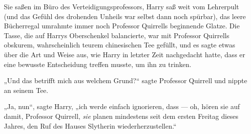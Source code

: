 Sie saßen im Büro des Verteidigungsprofessors, Harry saß weit vom Lehrerpult (und das Gefühl des drohenden Unheils war selbst dann noch spürbar), das leere Bücherregal umrahmte immer noch Professor Quirrells beginnende Glatze. Die Tasse, die auf Harrys Oberschenkel balancierte, war mit Professor Quirrells obskurem, wahrscheinlich teurem chinesischen Tee gefüllt, und es sagte etwas über die Art und Weise aus, wie Harry in letzter Zeit nachgedacht hatte, dass er eine bewusste Entscheidung treffen musste, um ihn zu trinken.

„Und das betrifft mich aus welchem Grund?“ sagte Professor Quirrell und nippte an seinem Tee.

„Ja, nun“, sagte Harry, „ich werde einfach ignorieren, dass — oh, hören sie auf damit, Professor Quirrell, \emph{sie} planen mindestens seit dem ersten Freitag dieses Jahres, den Ruf des Hauses Slytherin wiederherzustellen.“

